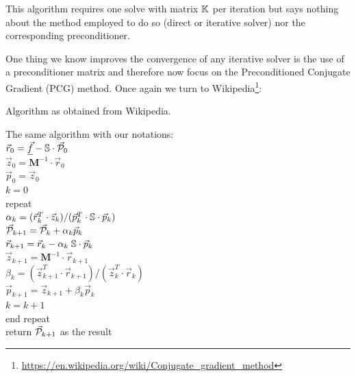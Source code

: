 \begin{remark} 
This algorithm requires one solve with matrix ${\mathbb{K}}$ per iteration 
but says nothing about the method employed to do so (direct or iterative solver)
nor the corresponding preconditioner.
\end{remark} 

One thing we know improves the convergence of any iterative solver is the use of a 
preconditioner matrix and therefore now focus on the Preconditioned Conjugate Gradient (PCG) method.
Once again we turn to Wikipedia\footnote{\url{https://en.wikipedia.org/wiki/Conjugate_gradient_method}}:

\begin{minipage}{0.40\textwidth}
\centering
{\captionfont Algorithm as obtained from Wikipedia.}\\
\end{minipage}\hfill
\begin{minipage}{0.50\textwidth}
The same algorithm with our notations:\\
$\vec{r}_0 = \underline{\vec{f}} - {\mathbb{S}} \cdot \vec{\cal P}_0$\\
$\vec{z}_0= {\bm M}^{-1} \cdot \vec{r}_0$ \\
$\vec{p}_0 = \vec{z}_0$\\
$k=0$ \\
repeat\\
\hspace{8mm} $\alpha_k = (\vec{r}_k^T\cdot \vec{z}_k )/(\vec{p}_k^T \cdot {\mathbb{S}}\cdot  \vec{p}_k )$\\
\hspace{8mm} $\vec{\cal P}_{k+1} = \vec{\cal P}_k+\alpha_k \vec{p}_k$\\
\hspace{8mm} $\vec{r}_{k+1} = \vec{r}_k - \alpha_k \; {\mathbb{S}} \cdot \vec{p}_k $ \\
\hspace{8mm} $\vec{z}_{k+1} = {\bm M}^{-1} \cdot \vec{r}_{k+1}$ \\
\hspace{8mm} $\beta_k=(\vec{z}_{k+1}^T \cdot \vec{r}_{k+1})/(\vec{z}_k^T \cdot \vec{r}_k)$ \\
\hspace{8mm} $\vec{p}_{k+1} =\vec{z}_{k+1}+ \beta_k \vec{p}_k$ \\
$k=k+1$ \\
end repeat\\
return $\vec{\cal P}_{k+1}$ as the result
\end{minipage}

